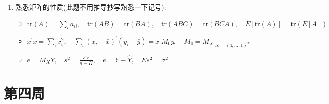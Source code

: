 \begin{enumerate}
\item 熟悉矩阵的性质(此题不用推导抄写熟悉一下记号):
\begin{itemize}
    \item $\text{tr}(A)=\sum_{i}a_{ii}, \quad \text{tr}(AB)=\text{tr}(BA), \quad \text{tr}(ABC)=\text{tr}(BCA), \quad E[\text{tr}(A)]=\text{tr}(E[A])$
    \item $x^{\prime}x=\sum_{i}x_{i}^{2}, \quad \sum_{i}(x_{i}-\bar{x})^{\prime}(y_{i}-\bar{y})=x^{\prime}M_{0}y, \quad M_{0}=M_{X}|_{X=(1,\dots,1)^{T}}$
    \item $e=M_{X}Y, \quad s^{2}=\frac{e^{\prime}e}{n-K}, \quad e=Y-\hat{Y}, \quad Es^{2}=\sigma^{2}$
\end{itemize}

\end{enumerate}


\section{第四周}

